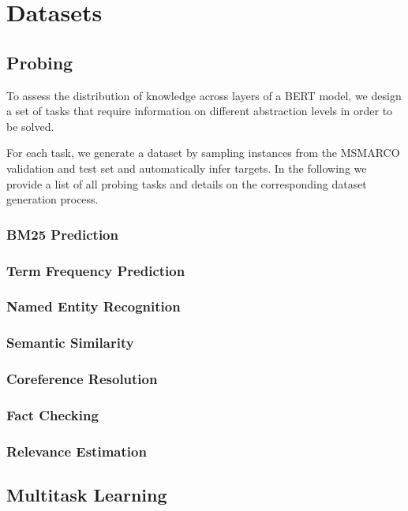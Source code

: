 \chapter{Datasets}
\label{chap:datasets}
\section{Probing}
To assess the distribution of knowledge across layers of a BERT model, we design a set of tasks that require information on different abstraction levels in order to be solved.

For each task, we generate a dataset by sampling instances from the MSMARCO validation and test set and automatically infer targets. In the following we provide a list of all probing tasks and details on the corresponding dataset generation process.

\subsection{BM25 Prediction}

\subsection{Term Frequency Prediction}

\subsection{Named Entity Recognition}

\subsection{Semantic Similarity}

\subsection{Coreference Resolution}

\subsection{Fact Checking}

\subsection{Relevance Estimation}

\section{Multitask Learning}